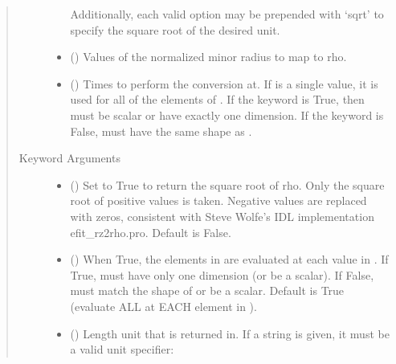 \documentclass[letterpaper,10pt,english]{sphinxmanual}
\begin{document}
\begin{fulllineitems}
\begin{fulllineitems}
\begin{quote}
\begin{description}
\begin{itemize}
Additionally, each valid option may be prepended with ‘sqrt’
to specify the square root of the desired unit.


\item {} 
 () \textendash{} Values of the normalized minor
radius to map to rho.

\item {} 
 () \textendash{} Times to perform the conversion at.
If  is a single value, it is used for all of the elements of
. If the  keyword is True, then  must be scalar
or have exactly one dimension. If the  keyword is False,
 must have the same shape as .

\end{itemize}

\item[{Keyword Arguments}] \leavevmode\begin{itemize}
\item {} 
 () \textendash{} Set to True to return the square root of rho.
Only the square root of positive values is taken. Negative
values are replaced with zeros, consistent with Steve Wolfe’s
IDL implementation efit\_rz2rho.pro. Default is False.

\item {} 
 () \textendash{} When True, the elements in  are evaluated
at each value in . If True,  must have only one dimension
(or be a scalar). If False,  must match the shape of 
or be a scalar. Default is True (evaluate ALL  at EACH
element in ).

\item {} 
 () \textendash{} 
Length unit that  is returned in.
If a string is given, it must be a valid unit specifier:
\begin{quote}



\end{quote}
\end{itemize}
\end{description}
\end{quote}
\end{fulllineitems}
\end{fulllineitems}
\end{document}
